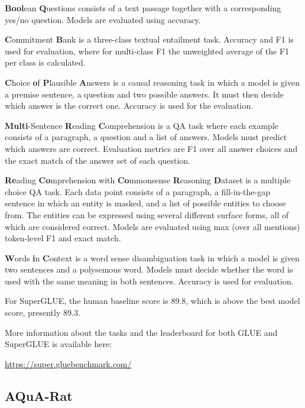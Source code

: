 \documentclass[]{krantz}
\begin{document}
\textbf{Bool}ean \textbf{Q}uestions consists of a text passage together with a corresponding yes/no question. Models are evaluated using accuracy.

\textbf{C}ommitment \textbf{B}ank is a three-class textual entailment task. Accuracy and F1 is used for evaluation, where for multi-class F1 the unweighted average of the F1 per class is calculated.

\textbf{C}hoice \textbf{o}f \textbf{P}lausible \textbf{A}nswers is a causal reasoning task in which a model is given a premise sentence, a question and two possible answers. It must then decide which answer is the correct one. Accuracy is used for the evaluation.

\textbf{Multi}-Sentence \textbf{R}eading \textbf{C}omprehension is a QA task where each example consists of a paragraph, a question and a list of answers. Models must predict which answers are correct. Evaluation metrics are F1 over all answer choices and the exact match of the answer set of each question.

\textbf{Re}ading \textbf{Co}mprehension with \textbf{Co}mmonsense \textbf{R}easoning \textbf{D}ataset is a multiple choice QA task. Each data point consists of a paragraph, a fill-in-the-gap sentence in which an entity is masked, and a list of possible entities to choose from. The entities can be expressed using several different surface forms, all of which are considered correct. Models are evaluated using max (over all mentions) token-level F1 and exact match.

\textbf{W}ords \textbf{i}n \textbf{C}ontext is a word sense disambiguation task in which a model is given two sentences and a polysemous word. Models must decide whether the word is used with the same meaning in both sentences. Accuracy is used for evaluation.

\citep{wang2019superglue}

For SuperGLUE, the human baseline score is 89.8, which is above the best model score, presently 89.3.

More information about the tasks and the leaderboard for both GLUE and SuperGLUE is available here:

\center \url{https://super.gluebenchmark.com/}

\flushleft

\hypertarget{aqua-rat}{%
\subsection{AQuA-Rat}\label{aqua-rat}}
\end{document}
